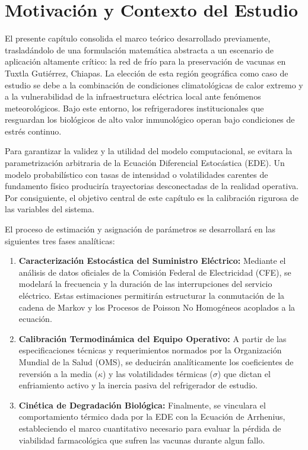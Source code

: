 \documentclass[
  spanish,
  letterpaper,
  DIV=11,
  numbers=noendperiod]{scrreprt}
\providecommand{\tightlist}{%
  \setlength{\itemsep}{0pt}\setlength{\parskip}{0pt}}
\theoremstyle{plain}
\theoremstyle{definition}
\theoremstyle{remark}
\begin{document}
\section{Motivación y Contexto del
Estudio}\label{sec-motivacion-contexto}

El presente capítulo consolida el marco teórico desarrollado
previamente, trasladándolo de una formulación matemática abstracta a un
escenario de aplicación altamente crítico: la red de frío para la
preservación de vacunas en Tuxtla Gutiérrez, Chiapas. La elección de
esta región geográfica como caso de estudio se debe a la combinación de
condiciones climatológicas de calor extremo y a la vulnerabilidad de la
infraestructura eléctrica local ante fenómenos meteorológicos. Bajo este
entorno, los refrigeradores institucionales que resguardan los
biológicos de alto valor inmunológico operan bajo condiciones de estrés
continuo.

Para garantizar la validez y la utilidad del modelo computacional, se
evitara la parametrización arbitraria de la Ecuación Diferencial
Estocástica (EDE). Un modelo probabilístico con tasas de intensidad o
volatilidades carentes de fundamento físico produciría trayectorias
desconectadas de la realidad operativa. Por consiguiente, el objetivo
central de este capítulo es la calibración rigurosa de las variables del
sistema.

El proceso de estimación y asignación de parámetros se desarrollará en
las siguientes tres fases analíticas:

\begin{enumerate}
\def\labelenumi{\arabic{enumi}.}
\tightlist
\item
  \textbf{Caracterización Estocástica del Suministro Eléctrico:}
  Mediante el análisis de datos oficiales de la Comisión Federal de
  Electricidad (CFE), se modelará la frecuencia y la duración de las
  interrupciones del servicio eléctrico. Estas estimaciones permitirán
  estructurar la conmutación de la cadena de Markov y los Procesos de
  Poisson No Homogéneos acoplados a la ecuación.
\item
  \textbf{Calibración Termodinámica del Equipo Operativo:} A partir de
  las especificaciones técnicas y requerimientos normados por la
  Organización Mundial de la Salud (OMS), se deducirán analíticamente
  los coeficientes de reversión a la media (\(\kappa\)) y las
  volatilidades térmicas (\(\sigma\)) que dictan el enfriamiento activo
  y la inercia pasiva del refrigerador de estudio.
\item
  \textbf{Cinética de Degradación Biológica:} Finalmente, se vinculara
  el comportamiento térmico dada por la EDE con la Ecuación de
  Arrhenius, estableciendo el marco cuantitativo necesario para evaluar
  la pérdida de viabilidad farmacológica que sufren las vacunas durante
  algun fallo.
\end{enumerate}
\end{document}
